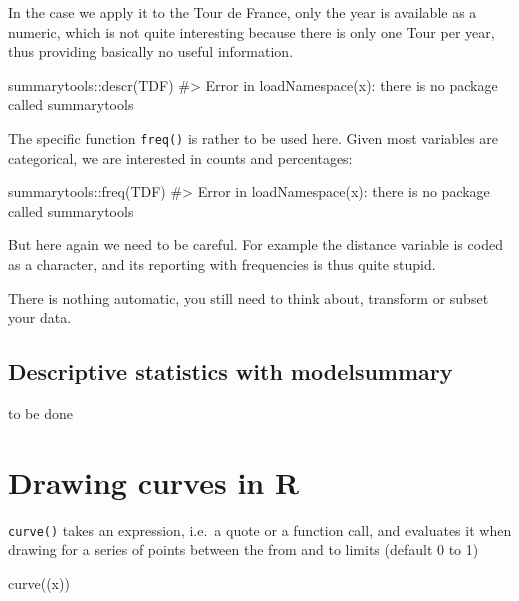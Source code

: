\documentclass[
  letterpaper,
  DIV=11,
  numbers=noendperiod]{scrreprt}
\newenvironment{Shaded}{\begin{snugshade}}{\end{snugshade}}
\newcommand{\CommentTok}[1]{\textcolor[rgb]{0.37,0.37,0.37}{#1}}
\newcommand{\FunctionTok}[1]{\textcolor[rgb]{0.28,0.35,0.67}{#1}}
\newcommand{\NormalTok}[1]{\textcolor[rgb]{0.00,0.23,0.31}{#1}}
\newcommand{\SpecialCharTok}[1]{\textcolor[rgb]{0.37,0.37,0.37}{#1}}
\begin{document}
In the case we apply it to the Tour de France, only the year is
available as a numeric, which is not quite interesting because there is
only one Tour per year, thus providing basically no useful information.

\begin{Shaded}
\begin{Highlighting}[]
\NormalTok{summarytools}\SpecialCharTok{::}\FunctionTok{descr}\NormalTok{(TDF)}
\CommentTok{\#\textgreater{} Error in loadNamespace(x): there is no package called \textquotesingle{}summarytools\textquotesingle{}}
\end{Highlighting}
\end{Shaded}

The specific function \texttt{freq()} is rather to be used here. Given
most variables are categorical, we are interested in counts and
percentages:

\begin{Shaded}
\begin{Highlighting}[]
\NormalTok{summarytools}\SpecialCharTok{::}\FunctionTok{freq}\NormalTok{(TDF)}
\CommentTok{\#\textgreater{} Error in loadNamespace(x): there is no package called \textquotesingle{}summarytools\textquotesingle{}}
\end{Highlighting}
\end{Shaded}

But here again we need to be careful. For example the distance variable
is coded as a character, and its reporting with frequencies is thus
quite stupid.

There is nothing automatic, you still need to think about, transform or
subset your data.

\section{Descriptive statistics with
modelsummary}\label{descriptive-statistics-with-modelsummary}

to be done

\chapter{Drawing curves in R}\label{drawing-curves-in-r}

\texttt{curve()} takes an expression, i.e.~a quote or a function call,
and evaluates it when drawing for a series of points between the from
and to limits (default 0 to 1)

\begin{Shaded}
\begin{Highlighting}[]
\FunctionTok{curve}\NormalTok{((x))}
\end{Highlighting}
\end{Shaded}
\end{document}
